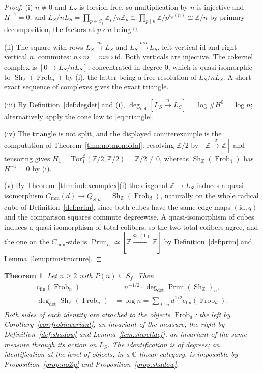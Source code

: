\documentclass[11pt]{amsart}
\newtheorem{theorem}{Theorem}[section]
\theoremstyle{definition}
\theoremstyle{remark}
\newcommand{\C}{\mathbb C}
\newcommand{\Z}{\mathbb Z}
\newcommand{\Frob}{\operatorname{Frob}}
\newcommand{\Sh}{\operatorname{Sh}}
\newcommand{\Prim}{\operatorname{Prim}}
\newcommand{\degdet}{\operatorname{deg}_{\mathrm{det}}}
\newcommand{\cfin}{\mathrm{c}_{\mathrm{fin}}}
\begin{document}
\begin{proof}
(i) $n\ne0$ and $L_S$ is torsion-free, so multiplication by $n$ is injective
and $H^{-1}=0$; and $L_S/nL_S=\prod_{p\in S_f}\Z_p/n\Z_p\cong
\prod_{p\mid n}\Z/p^{v_p(n)}\cong\Z/n$ by primary decomposition, the factors at
$p\nmid n$ being $0$.

(ii) The square with rows $L_S\xrightarrow{m}L_S$ and
$L_S\xrightarrow{mn}L_S$, left vertical $\mathrm{id}$ and right vertical $n$,
commutes: $n\circ m=mn\circ\mathrm{id}$. Both verticals are injective. The
cokernel complex is $[0\to L_S/nL_S]$, concentrated in degree $0$, which is
quasi-isomorphic to $\Sh_\Z(\Frob_n)$ by (i), the latter being a free
resolution of $L_S/nL_S$. A short exact sequence of complexes gives the exact
triangle.

(iii) By Definition~\ref{def:degdet} and (i),
$\degdet[L_S\xrightarrow{n}L_S]=\log\#H^0=\log n$; alternatively apply the cone
law to \eqref{eq:triangle}.

(iv) The triangle is not split, and the displayed counterexample is the
computation of Theorem~\ref{thm:notmonoidal}: resolving $\Z/2$ by
$[\Z\xrightarrow{2}\Z]$ and tensoring gives
$H_1=\mathrm{Tor}_1^\Z(\Z/2,\Z/2)=\Z/2\ne0$, whereas $\Sh_\Z(\Frob_4)$ has
$H^{-1}=0$ by (i).

(v) By Theorem~\ref{thm:indexcomplex}(i) the diagonal $\Z\to L_S$ induces a
quasi-isomorphism $C_{\mathrm{ram}}(d)\to Q_{S,d}=\Sh_\Z(\Frob_d)$, naturally
on the whole radical cube of Definition~\ref{def:prim}, since both cubes have
the same edge maps $(\mathrm{id},q)$ and the comparison squares commute
degreewise. A quasi-isomorphism of cubes induces a quasi-isomorphism of total
cofibers, so the two total cofibers agree, and the one on the
$C_{\mathrm{ram}}$-side is $\Prim_n\simeq[\Z\xrightarrow{\Phi_n(1)}\Z]$ by
Definition~\ref{def:prim} and Lemma~\ref{lem:primstructure}.
\end{proof}

\begin{theorem}\label{thm:shdegrees}
Let $n\ge2$ with $P(n)\subseteq S_f$. Then
\begin{align}
  \cfin(\Frob_n)&=n^{-1/2}\cdot\degdet\Prim(\Sh_\Z)_n,\label{eq:shdeg1}\\
  \degdet\Sh_\Z(\Frob_n)&=\log n=\sum_{d\mid n}d^{1/2}\cfin(\Frob_d).
   \label{eq:shdeg2}
\end{align}
Both sides of each identity are attached to the \emph{objects} $\Frob_d$: the
left by Corollary~\ref{cor:frobinvariant}, an invariant of the measure, the
right by Definition~\ref{def:shadow} and Lemma~\ref{lem:shwelldef}, an
invariant of the same measure through its action on $L_S$. The identification
is of degrees; an identification at the level of objects, in a $\C$-linear
category, is impossible by Proposition~\ref{prop:noZp} and
Proposition~\ref{prop:shadow}.
\end{theorem}
\end{document}
